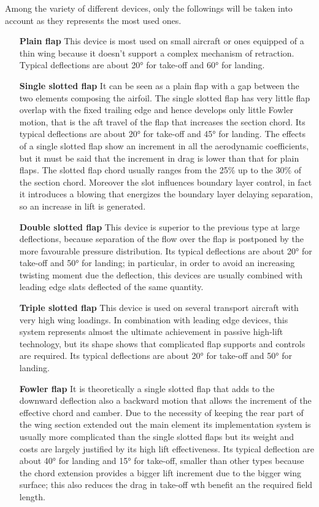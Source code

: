 %
\noindent
Among the variety of different devices, only the followings will be taken into account as they represents the most used ones.
%
\begin{itemize}
\item [\textbf{Plain flap}] This device is most used on small aircraft or ones equipped of a thin wing because it doesn’t support a complex mechanism of retraction. Typical deflections are about 20° for take-off and 60° for landing.
\item [\textbf{Single slotted flap}]  It can be seen as a plain flap with a gap between the two elements composing the airfoil. The single slotted flap has very little flap overlap with the fixed trailing edge and hence develops only little Fowler motion, that is the aft travel of the flap that increases the section chord. Its typical deflections are about 20° for take-off and 45° for landing.
%
The effects of a single slotted flap show an increment in all the aerodynamic coefficients, but it must be said that the increment in drag is lower than that for plain flaps. The slotted flap chord usually ranges from the 25\% up to the 30\% of the section chord. Moreover the slot influences boundary layer control, in fact it introduces a blowing that energizes the boundary layer delaying separation, so an increase in lift is generated.
\item[\textbf{Double slotted flap}] This device is superior to the previous type at large deflections, because separation of the flow over the flap is postponed by the more favourable pressure distribution. Its typical deflections are about 20° for take-off and 50° for landing; in particular, in order to avoid an increasing twisting moment due the deflection, this devices are usually combined with leading edge slats deflected of the same quantity. 
\item[\textbf{Triple slotted flap}] This device is used on several transport aircraft with very high wing loadings. In combination with leading edge devices, this system represents almost the ultimate achievement in passive high-lift technology, but its shape shows that complicated flap supports and controls are required. Its typical deflections are about 20° for take-off and 50° for landing.
\item[\textbf{Fowler flap}]  It is theoretically a single slotted flap that adds to the downward deflection also a backward motion that allows the increment of the effective chord and camber.
%
Due to the necessity of keeping the rear part of the wing section extended out the main element its implementation system is usually more complicated than the single slotted flaps but its weight and costs are largely justified by its high lift effectiveness. Its typical deflection are about 40° for landing and 15° for take-off, smaller than other types because the chord extension provides a bigger lift increment due to the bigger wing surface; this also reduces the drag in take-off wth benefit an the required field length.

\end{itemize}
